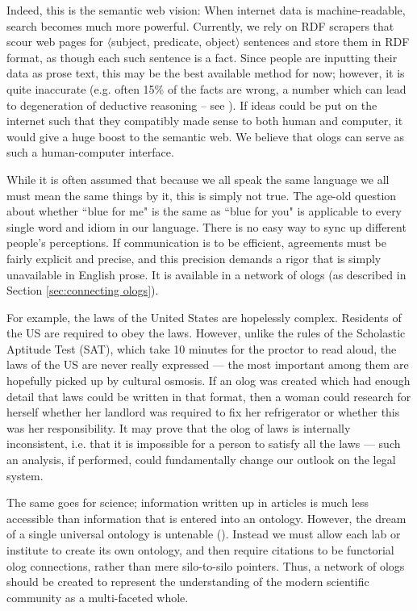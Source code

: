 \documentclass{amsart}
\theoremstyle{remark}
\theoremstyle{definition}
\begin{document}
Indeed, this is the semantic web vision: When internet data is machine-readable, search becomes much more powerful. Currently, we rely on RDF scrapers that scour web pages for $\langle$subject, predicate, object$\rangle$ sentences and store them in RDF format, as though each such sentence is a fact. Since people are inputting their data as prose text, this may be the best available method for now; however, it is quite inaccurate (e.g. often 15\% of the facts are wrong, a number which can lead to degeneration of deductive reasoning -- see \cite{MBCH}). If ideas could be put on the internet such that they compatibly made sense to both human and computer, it would give a huge boost to the semantic web. We believe that ologs can serve as such a human-computer interface.

While it is often assumed that because we all speak the same language we all must mean the same things by it, this is simply not true. The age-old question about whether ``blue for me" is the same as ``blue for you" is applicable to every single word and idiom in our language. There is no easy way to sync up different people's perceptions. If communication is to be efficient, agreements must be fairly explicit and precise, and this precision demands a rigor that is simply unavailable in English prose. It is available in a network of ologs (as described in Section \ref{sec:connecting ologs}). 

For example, the laws of the United States are hopelessly complex. Residents of the US are required to obey the laws. However, unlike the rules of the Scholastic Aptitude Test (SAT), which take 10 minutes for the proctor to read aloud, the laws of the US are never really expressed --- the most important among them are hopefully picked up by cultural osmosis. If an olog was created which had enough detail that laws could be written in that format, then a woman could research for  herself whether her landlord was required to fix her refrigerator or whether this was her responsibility. It may prove that the olog of laws is internally inconsistent, i.e. that it is impossible for a person to satisfy all the laws --- such an analysis, if performed, could fundamentally change our outlook on the legal system.

The same goes for science; information written up in articles is much less accessible than information that is entered into an ontology. However, the dream of a single universal ontology is untenable (\cite{Min}). Instead we must allow each lab or institute to create its own ontology, and then require citations to be functorial olog connections, rather than mere silo-to-silo pointers. Thus, a network of ologs should be created to represent the understanding of the modern scientific community as a multi-faceted whole.
\end{document}
